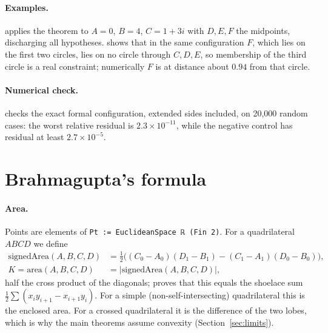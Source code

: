 \documentclass[11pt]{article}
\theoremstyle{definition}
\theoremstyle{remark}
\newcommand{\lean}[1]{\texttt{#1}}
\begin{document}
\paragraph{Examples.}  applies the theorem to $A=0$, $B=4$,
$C=1+3i$ with $D,E,F$ the midpoints, discharging all hypotheses. 
shows that in the same configuration $F$, which lies on the first two circles, lies on no circle
through $C,D,E$, so membership of the third circle is a real constraint; numerically $F$ is at
distance about $0.94$ from that circle.

\paragraph{Numerical check.}  checks the exact formal
configuration, extended sides included, on 20{,}000 random cases: the worst relative residual is
$2.3\times10^{-11}$, while the negative control has residual at least $2.7\times10^{-5}$.

\section{Brahmagupta's formula}\label{sec:brahmagupta}

\paragraph{Area.} Points are elements of \lean{Pt := EuclideanSpace ℝ (Fin 2)}. For a
quadrilateral $ABCD$ we define
\begin{align*}
\mathrm{signedArea}(A,B,C,D)&=\tfrac12\big((C_0-A_0)(D_1-B_1)-(C_1-A_1)(D_0-B_0)\big),\\
K=\mathrm{area}(A,B,C,D)&=|\mathrm{signedArea}(A,B,C,D)|,
\end{align*}
half the cross product of the diagonals;  proves that
this equals the shoelace sum $\tfrac12\sum(x_iy_{i+1}-x_{i+1}y_i)$. For a simple (non-self-intersecting)
quadrilateral this is the enclosed area. For a crossed quadrilateral it is the difference of the
two lobes, which is why the main theorems assume convexity (Section~\ref{sec:limits}).
\end{document}
